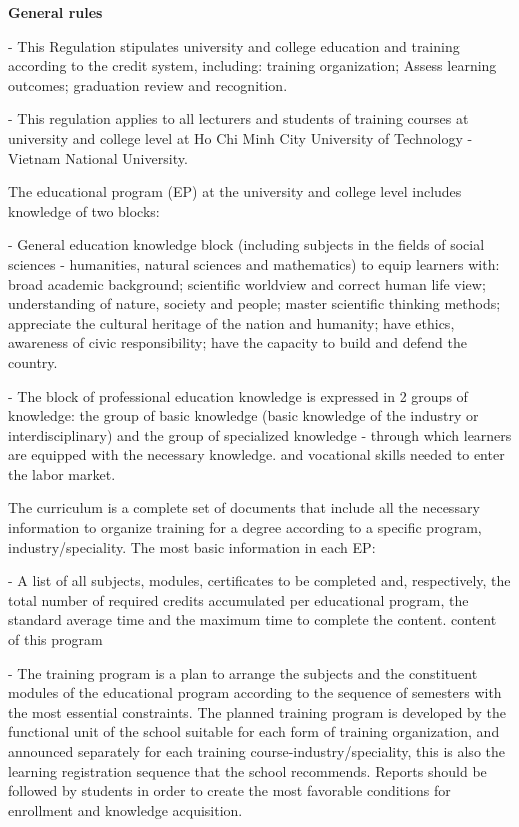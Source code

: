 \textbf{General rules}\\

- This Regulation stipulates university and college education and training according to the credit system, including: training organization; Assess learning outcomes; graduation review and recognition.

- This regulation applies to all lecturers and students of training courses at university and college level at Ho Chi Minh City University of Technology - Vietnam National University.

The educational program (EP) at the university and college level includes knowledge of two blocks:

- General education knowledge block (including subjects in the fields of social sciences - humanities, natural sciences and mathematics) to equip learners with: broad academic background; scientific worldview and correct human life view; understanding of nature, society and people; master scientific thinking methods; appreciate the cultural heritage of the nation and humanity; have ethics, awareness of civic responsibility; have the capacity to build and defend the country.

- The block of professional education knowledge is expressed in 2 groups of knowledge: the group of basic knowledge (basic knowledge of the industry or interdisciplinary) and the group of specialized knowledge - through which learners are equipped with the necessary knowledge. and vocational skills needed to enter the labor market.

The curriculum is a complete set of documents that include all the necessary information to organize training for a degree according to a specific program, industry/speciality. The most basic information in each EP:

- A list of all subjects, modules, certificates to be completed and, respectively, the total number of required credits accumulated per educational program, the standard average time and the maximum time to complete the content. content of this program

- The training program is a plan to arrange the subjects and the constituent modules of the educational program according to the sequence of semesters with the most essential constraints. The planned training program is developed by the functional unit of the school suitable for each form of training organization, and announced separately for each training course-industry/speciality, this is also the learning registration sequence that the school recommends. Reports should be followed by students in order to create the most favorable conditions for enrollment and knowledge acquisition.


